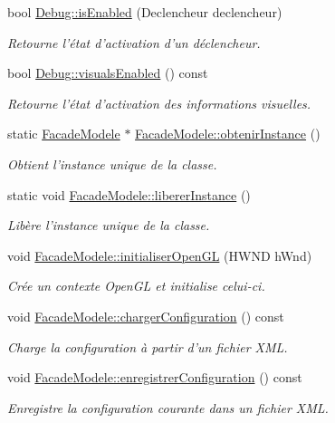 \begin{DoxyCompactItemize}
bool \hyperlink{group__inf2990_ga63c334cf7a3be794bb8b349c4938613d}{Debug\-::is\-Enabled} (Declencheur declencheur)
\begin{DoxyCompactList}\small\item\em Retourne l'état d'activation d'un déclencheur. \end{DoxyCompactList}\item 
bool \hyperlink{group__inf2990_ga15e281e19fa3282487c656ad14d55ee4}{Debug\-::visuals\-Enabled} () const 
\begin{DoxyCompactList}\small\item\em Retourne l'état d'activation des informations visuelles. \end{DoxyCompactList}\item 
static \hyperlink{class_facade_modele}{Facade\-Modele} $\ast$ \hyperlink{group__inf2990_ga63593b81c6f3cc2251e2b61d9e8fc670}{Facade\-Modele\-::obtenir\-Instance} ()
\begin{DoxyCompactList}\small\item\em Obtient l'instance unique de la classe. \end{DoxyCompactList}\item 
static void \hyperlink{group__inf2990_gacbf0495fda26f5be37089470dc5f4372}{Facade\-Modele\-::liberer\-Instance} ()
\begin{DoxyCompactList}\small\item\em Libère l'instance unique de la classe. \end{DoxyCompactList}\item 
void \hyperlink{group__inf2990_gabf12ccafbabf1049cb8327cf78699a1b}{Facade\-Modele\-::initialiser\-Open\-G\-L} (H\-W\-N\-D h\-Wnd)
\begin{DoxyCompactList}\small\item\em Crée un contexte Open\-G\-L et initialise celui-\/ci. \end{DoxyCompactList}\item 
void \hyperlink{group__inf2990_ga4967547e0683bfdca700118df1c18bca}{Facade\-Modele\-::charger\-Configuration} () const 
\begin{DoxyCompactList}\small\item\em Charge la configuration à partir d'un fichier X\-M\-L. \end{DoxyCompactList}\item 
void \hyperlink{group__inf2990_ga277d8d9cea21e20fb366a0d48525f2c9}{Facade\-Modele\-::enregistrer\-Configuration} () const 
\begin{DoxyCompactList}\small\item\em Enregistre la configuration courante dans un fichier X\-M\-L. \end{DoxyCompactList}\item 

\end{DoxyCompactItemize}
